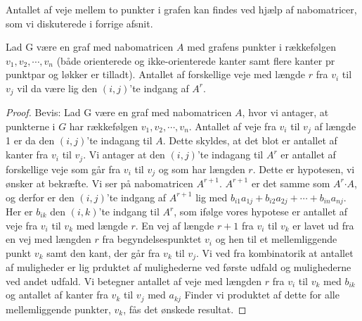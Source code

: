 Antallet af veje mellem to punkter i grafen kan findes ved hjælp af nabomatricer, som vi diskuterede i forrige afsnit.
\begin{thm}
Lad G være en graf med nabomatricen
\textbf{$A$} med grafens punkter i rækkefølgen $v_{1},v_{2},\cdots,v_{n}$ (både orienterede og ikke-orienterede kanter samt flere kanter pr punktpar og løkker er tilladt). Antallet af forskellige veje med længde $r$ fra $v_{i}$ til $v_{j}$ vil da være lig den $(i,j)$'te indgang af \textbf{$A^{r}$}.
\end{thm}

\begin{proof}
Bevis: Lad G være en graf med nabomatricen 
\textbf{$A$}, hvor vi antager, at punkterne i $G$ har rækkefølgen $v_{1},v_{2},\cdots,v_{n}$. Antallet af veje fra $v_{i}$ til $v_{j}$ af længde 1 er da den $(i,j)$'te indagang til 
\textbf{$A$}. Dette skyldes, at det blot er antallet af kanter fra $v_{i}$ til $v_{j}$.
Vi antager at den $(i,j)$'te indagang til 
\textbf{${A^r}$} er antallet af forskellige veje som går fra $v_{i}$ til $v_{j}$ og som har længden $r$. Dette er hypotesen, vi ønsker at bekræfte.
Vi ser på nabomatricen \textbf{$A^{r+1}$}. 
\textbf{$A^{r+1}$} er det samme som 
\textbf{$A^{r}$}$\cdot$\textbf{$A$}, og derfor er den $(i,j)$'te indgang af \textbf{$A^{r+1}$} lig med $b_{i1}a_{1j} + b_{i2}a_{2j} +\cdots+ b_{in}a_{nj}$. Her er $b_{ik}$  den $(i,k)$'te indgang til 
\textbf{$A^{r}$}, som ifølge vores hypotese er antallet af veje fra $v_{i}$ til $v_{k}$ med længde $r$.
En vej af længde $r + 1$ fra $v_{i}$ til $v_{k}$ er lavet ud fra en vej med længden $r$ fra begyndelsespunktet $v_{i}$ og hen til et mellemliggende punkt $v_{k}$ samt den kant, der går fra $v_{k}$ til $v_{j}$. Vi ved fra kombinatorik at antallet af muligheder er lig prduktet af mulighederne ved første udfald og mulighederne ved andet udfald. Vi betegner antallet af veje med længden $r$ fra $v_{i}$ til $v_{k}$ med $b_{ik}$ og antallet af kanter fra $v_{k}$ til $v_{j}$ med $a_{kj}$ Finder vi produktet af dette for alle mellemliggende punkter, $v_{k}$, fås det ønskede resultat.
\end{proof}

